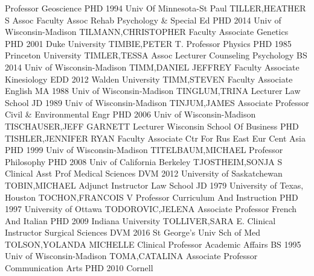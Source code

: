 \documentclass[
]{article}
\begin{document}
 \textbar Professor \textbar Geoscience \textbar PHD 1994
Univ Of Minnesota-St Paul \textbar TILLER,HEATHER S \textbar{}
 \textbar Assoc Faculty Assoc \textbar Rehab Psychology \&
Special Ed \textbar PHD 2014 Univ of Wisconsin-Madison
\textbar TILMANN,CHRISTOPHER \textbar{}  \textbar Faculty
Associate \textbar Genetics \textbar PHD 2001 Duke University
\textbar TIMBIE,PETER T. \textbar{}  \textbar Professor
\textbar Physics \textbar PHD 1985 Princeton University
\textbar TIMLER,TESSA \textbar{}  \textbar Assoc Lecturer
\textbar Counseling Psychology \textbar BS 2014 Univ of
Wisconsin-Madison \textbar TIMM,DANIEL JEFFREY \textbar{} 
\textbar Faculty Associate \textbar Kinesiology \textbar EDD 2012 Walden
University \textbar TIMM,STEVEN \textbar{}  \textbar Faculty
Associate \textbar English \textbar MA 1988 Univ of Wisconsin-Madison
\textbar TINGLUM,TRINA \textbar{}  \textbar Lecturer
\textbar Law School \textbar JD 1989 Univ of Wisconsin-Madison
\textbar TINJUM,JAMES \textbar{}  \textbar Associate
Professor \textbar Civil \& Environmental Engr \textbar PHD 2006 Univ of
Wisconsin-Madison \textbar TISCHAUSER,JEFF GARNETT \textbar{}
 \textbar Lecturer \textbar Wisconsin School Of Business
\textbar PHD \textbar TISHLER,JENNIFER RYAN \textbar{} 
\textbar Faculty Associate \textbar Ctr For Rus East Eur Cent Asia
\textbar PHD 1999 Univ of Wisconsin-Madison \textbar TITELBAUM,MICHAEL
\textbar{}  \textbar Professor \textbar Philosophy
\textbar PHD 2008 Univ of California Berkeley \textbar TJOSTHEIM,SONJA S
\textbar{}  \textbar Clinical Asst Prof \textbar Medical
Sciences \textbar DVM 2012 University of Saskatchewan
\textbar TOBIN,MICHAEL \textbar{}  \textbar Adjunct
Instructor \textbar Law School \textbar JD 1979 University of Texas,
Houston \textbar TOCHON,FRANCOIS V \textbar{} 
\textbar Professor \textbar Curriculum And Instruction \textbar PHD 1997
University of Ottawa \textbar TODOROVIC,JELENA \textbar{} 
\textbar Associate Professor \textbar French And Italian \textbar PHD
2009 Indiana University \textbar TOLLIVER,SARA E. \textbar{}
 \textbar Clinical Instructor \textbar Surgical Sciences
\textbar DVM 2016 St George's Univ Sch of Med \textbar TOLSON,YOLANDA
MICHELLE \textbar{}  \textbar Clinical Professor
\textbar Academic Affairs \textbar BS 1995 Univ of Wisconsin-Madison
\textbar TOMA,CATALINA \textbar{}  \textbar Associate
Professor \textbar Communication Arts \textbar PHD 2010 Cornell
\end{document}
